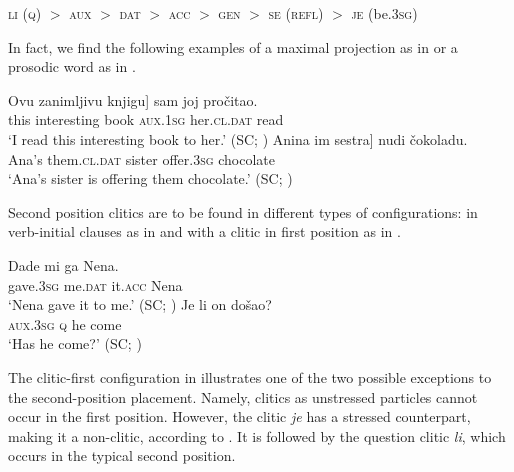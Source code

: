 \documentclass[output=paper,
colorlinks,
citecolor=brown,
newtxmath
]{langscibook}
\begin{document}
\begin{center}
\textsc{li} (\textsc{q}) $>$ \textsc{aux} $>$ \textsc{dat} $>$ \textsc{acc} $>$ \textsc{gen} $>$ \textsc{se} (\textsc{refl}) $>$ \textsc{je}
(be.\textsc{3sg})
\end{center}

\noindent In fact, we find the following examples of a maximal projection as in  or a prosodic word as in .


\ea\label{ex:zivojinovic:19}
\gll\minsp{[} Ovu  zanimljivu  knjigu] sam      joj         pročitao.\\
    {} this  interesting book    \textsc{aux.1sg}  her.\textsc{cl.dat} read \\
\glt `I read this interesting book to her.'
\hfill (SC; \citealt[219]{Franks.King2000})
\ex\label{ex:zivojinovic:20}
\gll\minsp{[} Anina im          sestra] nudi      čokoladu.           \\
    {} Ana’s  them.\textsc{cl.dat} sister  offer.\textsc{3sg} chocolate \\
\glt `Ana’s sister is offering them chocolate.'
\hfill (SC; \citealt[414]{Progovac1996})
\z

\noindent Second position clitics are to be found in different types of configurations: in verb-initial clauses as in  and with a clitic in first position as in .


\ea\label{ex:zivojinovic:21}
\gll Dade      mi      ga      Nena.           \\
     gave.\textsc{3sg} me.\textsc{dat}  it.\textsc{acc}  Nena \\
\glt `Nena gave it to me.'
\hfill (SC; \citealt[222]{Franks.King2000})
\ex\label{ex:zivojinovic:22}
\gll Je li on došao?\\
     \textsc{aux.3sg} \textsc{q} he come\\
\glt `Has he come?'
\hfill (SC; \citealt[46]{Radanovic-Kocic1988})
\z



\noindent The clitic-first configuration in  illustrates one of the two possible exceptions to the second-position placement. Namely, clitics as unstressed particles cannot occur in the first position. However, the clitic \textit{je} has a stressed counterpart, making it a non-clitic, according to \citet[226]{Franks.King2000}. It is followed by the question clitic \textit{li}, which occurs in the typical second position.
\end{document}
